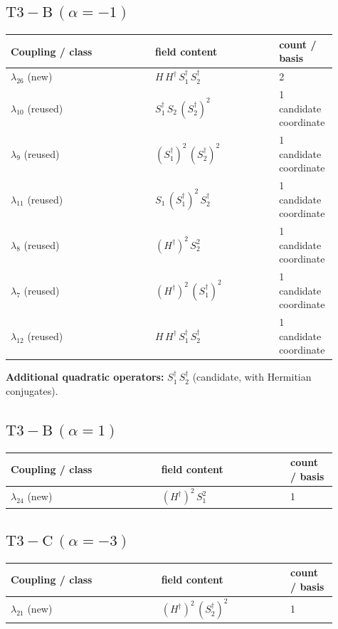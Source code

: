 \documentclass[9pt,a4paper]{article}
\begin{document}
\subsection*{$ \mathrm{T3-B}\,(\alpha=-1) $}
\begin{longtable}{@{}p{0.42\linewidth}p{0.36\linewidth}p{0.13\linewidth}@{}}
\toprule
Coupling / class & field content & count / basis\\
\midrule
\endhead
$\lambda_{26}$ (new) & $H\, H^\dagger\, S_1^\dagger\, S_2^\dagger$ & 2 \\
$\lambda_{10}$ (reused) & $S_1^\dagger\, S_2\, \left(S_2^\dagger\right)^{2}$ & 1 candidate coordinate \\
$\lambda_{9}$ (reused) & $\left(S_1^\dagger\right)^{2}\, \left(S_2^\dagger\right)^{2}$ & 1 candidate coordinate \\
$\lambda_{11}$ (reused) & $S_1\, \left(S_1^\dagger\right)^{2}\, S_2^\dagger$ & 1 candidate coordinate \\
$\lambda_{8}$ (reused) & $\left(H^\dagger\right)^{2}\, S_2^{2}$ & 1 candidate coordinate \\
$\lambda_{7}$ (reused) & $\left(H^\dagger\right)^{2}\, \left(S_1^\dagger\right)^{2}$ & 1 candidate coordinate \\
$\lambda_{12}$ (reused) & $H\, H^\dagger\, S_1^\dagger\, S_2^\dagger$ & 1 candidate coordinate \\
\bottomrule
\end{longtable}
\textbf{Additional quadratic operators:}
$S_1^\dagger\, S_2^\dagger$ (candidate, with Hermitian conjugates).
\subsection*{$ \mathrm{T3-B}\,(\alpha=1) $}
\begin{longtable}{@{}p{0.42\linewidth}p{0.36\linewidth}p{0.13\linewidth}@{}}
\toprule
Coupling / class & field content & count / basis\\
\midrule
\endhead
$\lambda_{24}$ (new) & $\left(H^\dagger\right)^{2}\, S_1^{2}$ & 1 \\
\bottomrule
\end{longtable}
\subsection*{$ \mathrm{T3-C}\,(\alpha=-3) $}
\begin{longtable}{@{}p{0.42\linewidth}p{0.36\linewidth}p{0.13\linewidth}@{}}
\toprule
Coupling / class & field content & count / basis\\
\midrule
\endhead
$\lambda_{21}$ (new) & $\left(H^\dagger\right)^{2}\, \left(S_2^\dagger\right)^{2}$ & 1 \\
\bottomrule
\end{longtable}
\end{document}
